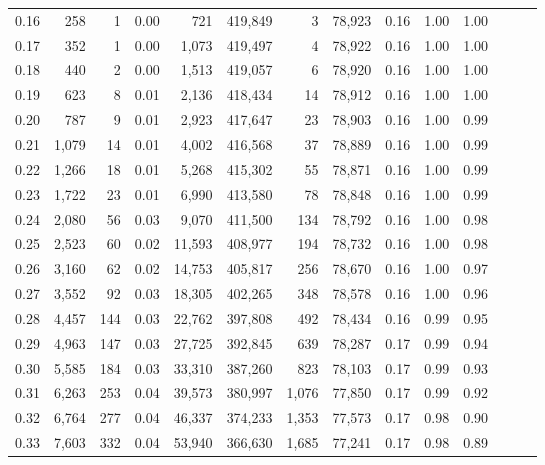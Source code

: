 \begin{tabular}{rrrrrrrrrrrrrr}
0.16 &     258 &      1 &  0.00 &      721 &  419,849 &       3 &  78,923 &  0.16 &  1.00 &      1.00 \\
0.17 &     352 &      1 &  0.00 &    1,073 &  419,497 &       4 &  78,922 &  0.16 &  1.00 &      1.00 \\
0.18 &     440 &      2 &  0.00 &    1,513 &  419,057 &       6 &  78,920 &  0.16 &  1.00 &      1.00 \\
0.19 &     623 &      8 &  0.01 &    2,136 &  418,434 &      14 &  78,912 &  0.16 &  1.00 &      1.00 \\
0.20 &     787 &      9 &  0.01 &    2,923 &  417,647 &      23 &  78,903 &  0.16 &  1.00 &      0.99 \\
0.21 &   1,079 &     14 &  0.01 &    4,002 &  416,568 &      37 &  78,889 &  0.16 &  1.00 &      0.99 \\
0.22 &   1,266 &     18 &  0.01 &    5,268 &  415,302 &      55 &  78,871 &  0.16 &  1.00 &      0.99 \\
0.23 &   1,722 &     23 &  0.01 &    6,990 &  413,580 &      78 &  78,848 &  0.16 &  1.00 &      0.99 \\
0.24 &   2,080 &     56 &  0.03 &    9,070 &  411,500 &     134 &  78,792 &  0.16 &  1.00 &      0.98 \\
0.25 &   2,523 &     60 &  0.02 &   11,593 &  408,977 &     194 &  78,732 &  0.16 &  1.00 &      0.98 \\
0.26 &   3,160 &     62 &  0.02 &   14,753 &  405,817 &     256 &  78,670 &  0.16 &  1.00 &      0.97 \\
0.27 &   3,552 &     92 &  0.03 &   18,305 &  402,265 &     348 &  78,578 &  0.16 &  1.00 &      0.96 \\
0.28 &   4,457 &    144 &  0.03 &   22,762 &  397,808 &     492 &  78,434 &  0.16 &  0.99 &      0.95 \\
0.29 &   4,963 &    147 &  0.03 &   27,725 &  392,845 &     639 &  78,287 &  0.17 &  0.99 &      0.94 \\
0.30 &   5,585 &    184 &  0.03 &   33,310 &  387,260 &     823 &  78,103 &  0.17 &  0.99 &      0.93 \\
0.31 &   6,263 &    253 &  0.04 &   39,573 &  380,997 &   1,076 &  77,850 &  0.17 &  0.99 &      0.92 \\
0.32 &   6,764 &    277 &  0.04 &   46,337 &  374,233 &   1,353 &  77,573 &  0.17 &  0.98 &      0.90 \\
0.33 &   7,603 &    332 &  0.04 &   53,940 &  366,630 &   1,685 &  77,241 &  0.17 &  0.98 &      0.89 \\

\end{tabular}

